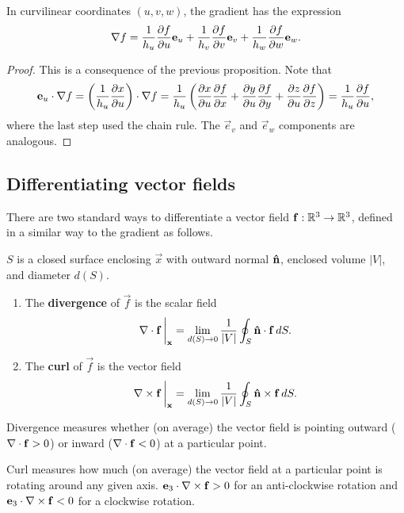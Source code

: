 \documentclass[10pt, a4paper]{article}
\begin{document}
\begin{proposition}
    In curvilinear coordinates $(u, v, w)$,
    the gradient has the expression
    \[
    \bnabla f = \frac{1}{h_u}\pd[f]{u}\vec{e}_u + \frac{1}{h_v}\pd[f]{v}\vec{e}_v + \frac{1}{h_w}\pd[f]{w}\vec{e}_w.
    \]

    \begin{proof}
        This is a consequence of the previous proposition.
        Note that
        \[
        \vec{e}_u \cdot \bnabla f = \left(\frac{1}{h_u}\pd[x]{u}\right) \cdot\bnabla f = \frac{1}{h_u}\left(\pd[x]{u}\pd[f]{x} + \pd[y]{u}\pd[f]{y} + \pd[z]{u}\pd[f]{z}\right) = \frac{1}{h_u}\pd[f]{u},
        \]
        where the last step used the chain rule.
        The $\vec{e}_v$ and $\vec{e}_w$ components are analogous.
    \end{proof}
\end{proposition}

\subsection{Differentiating vector fields}
There are two standard ways to differentiate a vector field $\vec{f} : \R ^ 3 \to \R ^ 3$,
defined in a similar way to the gradient as follows.

$S$ is a closed surface enclosing $\vec{x}$ with outward normal $\hvec{n}$,
enclosed volume $|V|$,
and diameter $d(S)$.

\begin{enumerate}[label = \arabic*.]
    \item The \textbf{divergence} of $\vec{f}$ is the scalar field
    \[
    \bnabla \cdot \vec{f}\,\biggr|_{\vec{x}} = \lim_{d(S) \to 0}\frac{1}{|V|}\oint_{S}\hvec{n} \cdot \vec{f}\,dS.
    \]

    \item The \textbf{curl} of $\vec{f}$ is the vector field
    \[
    \bnabla \times \vec{f}\,\biggr|_{\vec{x}} = \lim_{d(S) \to 0}\frac{1}{|V|}\oint_{S}\hvec{n} \times \vec{f}\,dS.
    \]
\end{enumerate}

Divergence measures whether
(on average)
the vector field is pointing outward
($\bnabla \cdot \vec{f} > 0$)
or inward
($\bnabla \cdot \vec{f} < 0$)
at a particular point.

Curl measures how much
(on average)
the vector field at a particular point is rotating around any given axis.
$\vec{e}_3 \cdot \bnabla \times \vec{f} > 0$ for an anti-clockwise rotation and $\vec{e}_3 \cdot \bnabla \times \vec{f} < 0$ for a clockwise rotation.
\end{document}
